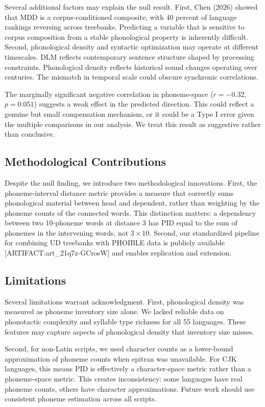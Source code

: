 \documentclass[11pt,letterpaper]{article}
\begin{document}
Several additional factors may explain the null result. First, Chen (2026) showed that MDD is a corpus-conditioned composite, with 40 percent of language rankings reversing across treebanks. Predicting a variable that is sensitive to corpus composition from a stable phonological property is inherently difficult. Second, phonological density and syntactic optimization may operate at different timescales. DLM reflects contemporary sentence structure shaped by processing constraints. Phonological density reflects historical sound changes operating over centuries. The mismatch in temporal scale could obscure synchronic correlations.

The marginally significant negative correlation in phoneme-space ($r = -0.32$, $p = 0.051$) suggests a weak effect in the predicted direction. This could reflect a genuine but small compensation mechanism, or it could be a Type I error given the multiple comparisons in our analysis. We treat this result as suggestive rather than conclusive.

\subsection{Methodological Contributions}

Despite the null finding, we introduce two methodological innovations. First, the phoneme-interval distance metric provides a measure that correctly sums phonological material between head and dependent, rather than weighting by the phoneme counts of the connected words. This distinction matters: a dependency between two 10-phoneme words at distance 3 has PID equal to the sum of phonemes in the intervening words, not $3 \times 10$. Second, our standardized pipeline for combining UD treebanks with PHOIBLE data is publicly available [ARTIFACT:art\_21q7z-GCrosW] and enables replication and extension.

\subsection{Limitations}

Several limitations warrant acknowledgment. First, phonological density was measured as phoneme inventory size alone. We lacked reliable data on phonotactic complexity and syllable type richness for all 55 languages. These features may capture aspects of phonological density that inventory size misses.

Second, for non-Latin scripts, we used character counts as a lower-bound approximation of phoneme counts when epitran was unavailable. For CJK languages, this means PID is effectively a character-space metric rather than a phoneme-space metric. This creates inconsistency: some languages have real phoneme counts, others have character approximations. Future work should use consistent phoneme estimation across all scripts.
\end{document}
